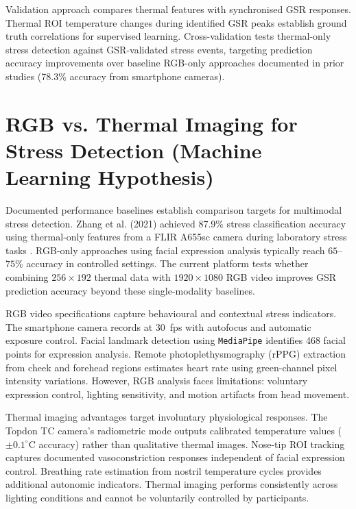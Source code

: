\documentclass{report}
\begin{document}
    Validation approach compares thermal features with synchronised GSR responses. Thermal ROI temperature changes during identified GSR peaks establish ground truth correlations for supervised learning. Cross-validation tests thermal-only stress detection against GSR-validated stress events, targeting prediction accuracy improvements over baseline RGB-only approaches documented in prior studies (78.3\% accuracy from smartphone cameras).


    \section{RGB vs. Thermal Imaging for Stress Detection (Machine Learning Hypothesis)}
    \label{sec:rgb_vs_thermal}

    Documented performance baselines establish comparison targets for multimodal stress detection. Zhang et al. (2021) achieved 87.9\% stress classification accuracy using thermal-only features from a FLIR A655sc camera during laboratory stress tasks \cite{zhang2021}. RGB-only approaches using facial expression analysis typically reach $65$--$75$\% accuracy in controlled settings. The current platform tests whether combining $256 \times 192$ thermal data with $1920 \times 1080$ RGB video improves GSR prediction accuracy beyond these single-modality baselines.

    RGB video specifications capture behavioural and contextual stress indicators. The smartphone camera records at 30~fps with autofocus and automatic exposure control. Facial landmark detection using \texttt{MediaPipe} identifies 468 facial points for expression analysis. Remote photoplethysmography (rPPG) extraction from cheek and forehead regions estimates heart rate using green-channel pixel intensity variations. However, RGB analysis faces limitations: voluntary expression control, lighting sensitivity, and motion artifacts from head movement.

    Thermal imaging advantages target involuntary physiological responses. The Topdon TC camera's radiometric mode outputs calibrated temperature values ($\pm 0.1^{\circ}$C accuracy) rather than qualitative thermal images. Nose-tip ROI tracking captures documented vasoconstriction responses independent of facial expression control. Breathing rate estimation from nostril temperature cycles provides additional autonomic indicators. Thermal imaging performs consistently across lighting conditions and cannot be voluntarily controlled by participants.
\end{document}
